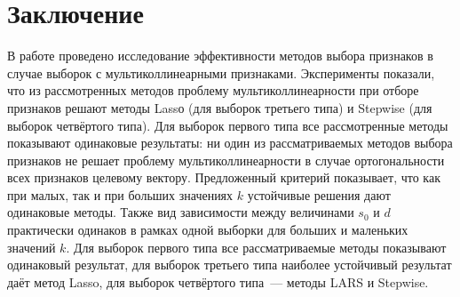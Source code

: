 \documentclass[a4paper,12pt]{article}
\begin{document}
\section{Заключение}
В работе проведено исследование эффективности методов выбора признаков в случае выборок с мультиколлинеарными признаками. Эксперименты показали, что из рассмотренных методов проблему мультиколлинеарности при отборе признаков решают методы Lassо (для выборок третьего типа) и Stepwise (для выборок четвёртого типа). Для выборок первого типа все рассмотренные методы показывают одинаковые результаты: ни один из рассматриваемых методов выбора признаков не решает проблему мультиколлинеарности в случае ортогональности всех признаков целевому вектору. Предложенный критерий показывает, что как при малых, так и при больших значениях $k$ устойчивые решения дают одинаковые методы. Также вид зависимости между величинами $s_0$ и $d$ практически одинаков в рамках одной выборки для больших и маленьких значений  $k$. Для выборок первого типа все рассматриваемые методы показывают одинаковый результат, для выборок третьего типа наиболее устойчивый результат даёт метод Lasso, для выборок четвёртого типа~--- методы LARS и Stepwise.



\end{document}
